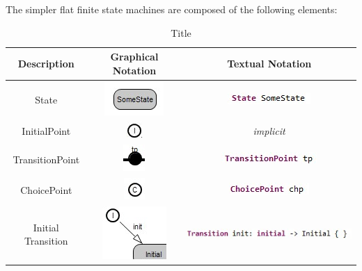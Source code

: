 The simpler flat finite state machines are composed of the following elements:

\begin{table}
\caption{Title}
\begin{tabular}{|c|c|c|}
\hline
 \textbf{Description} & \textbf{Graphical Notation} & \textbf{Textual Notation} \\ \hline
 State & \includegraphics{images/040-State.jpg} & \includegraphics[scale=0.7]{images/040-StateTextual.jpg} 
\\ \hline
 InitialPoint & \includegraphics{images/040-InitialPoint.jpg} & \textit{implicit} \\ \hline
 TransitionPoint & \includegraphics{images/040-TransitionPoint.jpg} & 
\includegraphics[scale=0.7]{images/040-TransitionPointTextual.jpg} \\ \hline
 ChoicePoint & \includegraphics{images/040-ChoicePoint.jpg} & 
\includegraphics[scale=0.7]{images/040-ChoicePointTextual.jpg} \\ \hline
 Initial Transition & \includegraphics[scale=0.7]{images/040-InitialTransition.jpg} & 
\includegraphics[scale=0.7]{images/040-InitialTransitionTextual.jpg} \\ \hline

\end{tabular}
\end{table}
